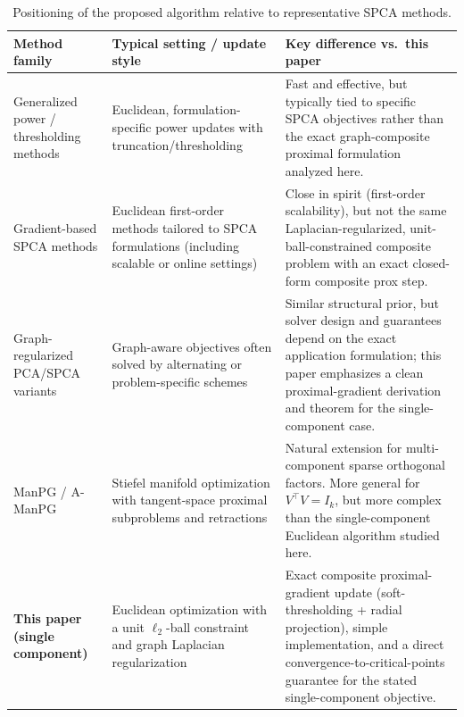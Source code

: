 \documentclass[10pt,twocolumn,letterpaper]{article}
\theoremstyle{definition}
\begin{document}
\begin{table}[t]
\centering
\caption{Positioning of the proposed algorithm relative to representative SPCA methods.}
\label{tab:algorithm_comparison}
\small
\setlength{\tabcolsep}{4pt}
\renewcommand{\arraystretch}{1.08}
\begin{tabularx}{\textwidth}{>{\raggedright\arraybackslash}p{3.0cm}YY}
\toprule
Method family & Typical setting / update style & Key difference vs.\ this paper \\
\midrule
Generalized power / thresholding methods \cite{journee2010gpower} & Euclidean, formulation-specific power updates with truncation/thresholding & Fast and effective, but typically tied to specific SPCA objectives rather than the exact graph-composite proximal formulation analyzed here. \\
Gradient-based SPCA methods \cite{qiu2023biometrikaGradientSPCA} & Euclidean first-order methods tailored to SPCA formulations (including scalable or online settings) & Close in spirit (first-order scalability), but not the same Laplacian-regularized, unit-ball-constrained composite problem with an exact closed-form composite prox step. \\
Graph-regularized PCA/SPCA variants \cite{miao2022genomeNetworkSPCA} & Graph-aware objectives often solved by alternating or problem-specific schemes & Similar structural prior, but solver design and guarantees depend on the exact application formulation; this paper emphasizes a clean proximal-gradient derivation and theorem for the single-component case. \\
ManPG / A-ManPG \cite{chen2020manpg,chen2020amanpg} & Stiefel manifold optimization with tangent-space proximal subproblems and retractions & Natural extension for multi-component sparse orthogonal factors. More general for $V^\top V=I_k$, but more complex than the single-component Euclidean algorithm studied here. \\
\textbf{This paper (single component)} & Euclidean optimization with a unit $\ell_2$-ball constraint and graph Laplacian regularization & Exact composite proximal-gradient update (soft-thresholding + radial projection), simple implementation, and a direct convergence-to-critical-points guarantee for the stated single-component objective. \\
\bottomrule
\end{tabularx}
\end{table}

\end{document}
